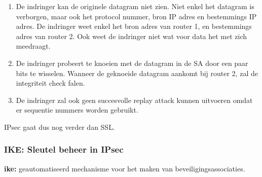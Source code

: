 \begin{enumerate}
    \item De indringer kan de originele datagram niet zien. Niet enkel het datagram is verborgen, maar ook het protocol nummer, bron IP adres en bestemmings IP adres. De indringer weet enkel het bron adres van router 1, en bestemmings adres van router 2. Ook weet de indringer niet wat voor data het met zich meedraagt.
\item De indringer probeert te knoeien met de datagram in de SA door een paar bits te wisselen. Wanneer de geknoeide datagram aankomt bij router 2, zal de integriteit check falen.
\item De indringer zal ook geen succesvolle replay attack kunnen uitvoeren omdat er sequentie nummers worden gebruikt.
\end{enumerate}

\noindent IPsec gaat dus nog verder dan SSL.



\subsubsection{IKE: Sleutel beheer in IPsec}

\textbf{\acrfull{ike}:} geautomatiseerd mechanisme voor het maken van beveiligingsassociaties.

